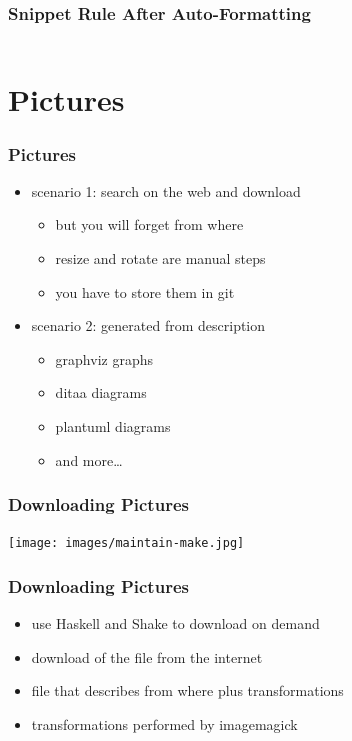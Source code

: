 \documentclass{beamer}
\begin{document}
\begin{frame}
  \frametitle{Snippet Rule \textemdash{} After Auto-Formatting}
  \begin{center}
    \inputminted[autogobble, highlightlines={2-4}]{haskell}{snippets/haskell-snippet-rule.hs}
  \end{center}
\end{frame}

\section{Pictures}

\begin{frame}
  \frametitle{Pictures}
  \begin{itemize}
  \item scenario 1: search on the web and download
    \begin{itemize}
    \item but you will forget from where
    \item resize and rotate are manual steps
    \item you have to store them in git
    \end{itemize}
  \item scenario 2: generated from description
    \begin{itemize}
    \item graphviz graphs
    \item ditaa diagrams
    \item plantuml diagrams
    \item and more\ldots{}
    \end{itemize}
  \end{itemize}
\end{frame}

\begin{frame}
  \frametitle{Downloading Pictures}
  \begin{center}
    \texttt{[image: images/maintain-make.jpg]}
  \end{center}
\end{frame}

\begin{frame}
  \frametitle{Downloading Pictures}
  \begin{itemize}
  \item use Haskell and Shake to download on demand
  \item download of the file from the internet
  \item file that describes from where plus transformations
  \item transformations performed by imagemagick
  \end{itemize}
\end{frame}
\end{document}
